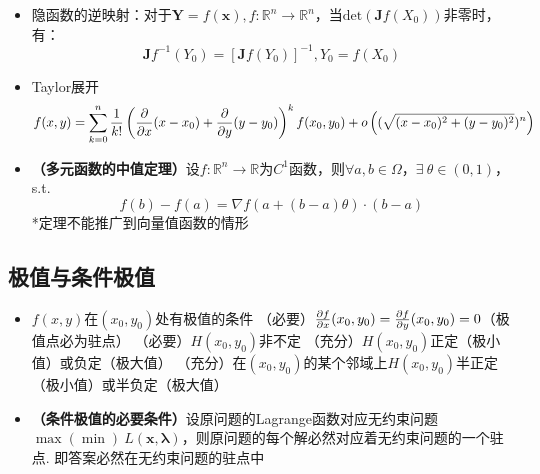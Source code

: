 \documentclass[./main.tex]{subfiles}
\begin{document}
\begin{itemize}
  \item 隐函数的逆映射：对于$\bm{Y}=f(\bm{x}),f:\mathbb{R}^n\rightarrow\mathbb{R}^n$，当$\text{det}(\bm{J}f(X_0))$非零时，有：
  $$\bm{J}f^{-1}(Y_0)=[\bm{J}f(Y_0)]^{-1},Y_0=f(X_0)$$
  \item[\ding{72}] Taylor展开
  $$f(x,y)=\sum_{k=0}^{n}\frac{1}{k!}\left(\frac{\partial}{\partial x}(x-x_0)+\frac{\partial}{\partial y}(y-y_0)\right)^kf(x_0,y_0)+o\left((\sqrt{(x-x_0)^2+(y-y_0)^2})^n\right)$$
  \item[\ding{72}] \textbf{（多元函数的中值定理）}设$f:\mathbb{R}^n\rightarrow\mathbb{R}$为$C^1$函数，则$\forall a,b\in\Omega$，$\exists\ \theta\in(0,1)$，s.t.
  $$f(b)-f(a)=\nabla f(a+(b-a)\theta)\cdot(b-a)$$
  *定理不能推广到向量值函数的情形
\end{itemize}
\subsection{极值与条件极值}
\begin{itemize}
  \item[\ding{72}] $f(x,y)$在$(x_0,y_0)$处有极值的条件
  \subitem （必要）$\frac{\partial f}{\partial x}(x_0,y_0)=\frac{\partial f}{\partial y}(x_0,y_0)=0$（极值点必为驻点）
  \subitem （必要）$H(x_0,y_0)$非不定
  \subitem （充分）$H(x_0,y_0)$正定（极小值）或负定（极大值）
  \subitem （充分）在$(x_0,y_0)$的某个邻域上$H(x_0,y_0)$半正定（极小值）或半负定（极大值）
  \item \textbf{（条件极值的必要条件）}设原问题的Lagrange函数对应无约束问题$\max(\min)\ L(\bm{x},\bm{\lambda})$，则原问题的每个解必然对应着无约束问题的一个驻点. 即答案必然在无约束问题的驻点中
\end{itemize}
\end{document}
